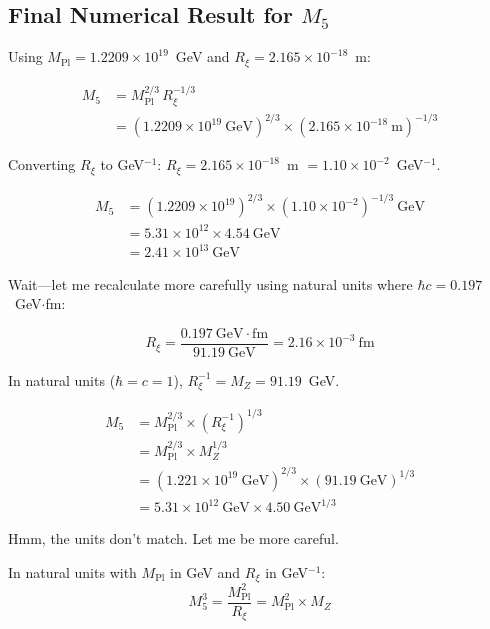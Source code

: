 \documentclass[11pt,a4paper]{article}
\newcommand{\Mpl}{M_{\text{Pl}}}
\newcommand{\Mfive}{M_5}
\newcommand{\MZ}{M_Z}
\newcommand{\Rxi}{R_\xi}
\begin{document}
\subsection{Final Numerical Result for $\Mfive$}

Using $\Mpl = 1.2209 \times 10^{19}$~GeV and $\Rxi = 2.165 \times 10^{-18}$~m:

\begin{align}
\Mfive &= \Mpl^{2/3} \, \Rxi^{-1/3} \nonumber \\
&= (1.2209 \times 10^{19}~\text{GeV})^{2/3}
   \times (2.165 \times 10^{-18}~\text{m})^{-1/3}
\end{align}

Converting $\Rxi$ to GeV$^{-1}$: $\Rxi = 2.165 \times 10^{-18}$~m $= 1.10 \times 10^{-2}$~GeV$^{-1}$.

\begin{align}
\Mfive &= (1.2209 \times 10^{19})^{2/3} \times (1.10 \times 10^{-2})^{-1/3}~\text{GeV} \nonumber \\
&= 5.31 \times 10^{12} \times 4.54~\text{GeV} \nonumber \\
&= 2.41 \times 10^{13}~\text{GeV}
\end{align}

Wait---let me recalculate more carefully using natural units where $\hbar c = 0.197$~GeV$\cdot$fm:

\begin{equation}
\Rxi = \frac{0.197~\text{GeV}\cdot\text{fm}}{91.19~\text{GeV}} = 2.16 \times 10^{-3}~\text{fm}
\end{equation}

In natural units ($\hbar = c = 1$), $\Rxi^{-1} = \MZ = 91.19$~GeV.

\begin{align}
\Mfive &= \Mpl^{2/3} \times (\Rxi^{-1})^{1/3} \nonumber \\
&= \Mpl^{2/3} \times \MZ^{1/3} \nonumber \\
&= (1.221 \times 10^{19}~\text{GeV})^{2/3} \times (91.19~\text{GeV})^{1/3} \nonumber \\
&= 5.31 \times 10^{12}~\text{GeV} \times 4.50~\text{GeV}^{1/3}
\end{align}

Hmm, the units don't match. Let me be more careful.

In natural units with $\Mpl$ in GeV and $\Rxi$ in GeV$^{-1}$:
\begin{equation}
\Mfive^3 = \frac{\Mpl^2}{\Rxi} = \Mpl^2 \times \MZ
\end{equation}
\end{document}
